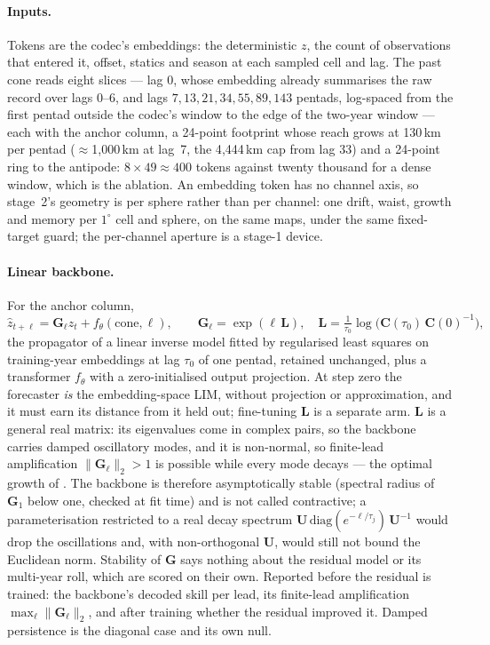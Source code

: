 \documentclass[10pt]{article}
\begin{document}
\paragraph{Inputs.} Tokens are the codec's embeddings: the deterministic
$z$, the count of observations that entered it, offset, statics and season
at each sampled cell and lag. The past cone reads eight slices --- lag 0,
whose embedding already summarises the raw record over lags 0--6, and lags
$7,13,21,34,55,89,143$ pentads, log-spaced from the first pentad outside the
codec's window to the edge of the two-year window --- each with the anchor
column, a 24-point footprint whose reach grows at 130\,km per pentad
(${\approx}$1{,}000\,km at lag~7, the 4{,}444\,km cap from lag 33) and a
24-point ring to the antipode: $8\times49\approx400$ tokens against twenty
thousand for a dense window, which is the ablation. An embedding token has
no channel axis, so stage~2's geometry is per sphere rather than per channel:
one drift, waist, growth and memory per $1^\circ$ cell and sphere, on the
same maps, under the same fixed-target guard; the per-channel aperture is a
stage-1 device.

\paragraph{Linear backbone.} For the anchor column,
\begin{equation}
\hat z_{t+\ell}=\mathbf{G}_\ell z_t+f_\theta(\text{cone},\ell),\qquad
\mathbf{G}_\ell=\exp(\ell\,\mathbf{L}),\quad
\mathbf{L}=\tfrac{1}{\tau_0}\log\!\big(\mathbf{C}(\tau_0)\,\mathbf{C}(0)^{-1}\big) ,
\end{equation}
the propagator of a linear inverse model \cite{penland,newman} fitted by
regularised least squares on training-year embeddings at lag
$\tau_0$ of one pentad, retained unchanged, plus a transformer $f_\theta$
with a zero-initialised output projection. At step zero the forecaster
\emph{is} the embedding-space LIM, without projection or approximation, and
it must earn its distance from it held out; fine-tuning $\mathbf{L}$ is a
separate arm. $\mathbf{L}$ is a general real matrix: its eigenvalues come in
complex pairs, so the backbone carries damped oscillatory modes, and it is
non-normal, so finite-lead amplification $\|\mathbf{G}_\ell\|_2>1$ is
possible while every mode decays --- the optimal growth of \cite{penland}.
The backbone is therefore asymptotically stable (spectral radius of
$\mathbf{G}_1$ below one, checked at fit time) and is not called contractive;
a parameterisation restricted to a real decay spectrum
$\mathbf{U}\,\mathrm{diag}(e^{-\ell/\tau_j})\,\mathbf{U}^{-1}$ would drop the
oscillations and, with non-orthogonal $\mathbf{U}$, would still not bound the
Euclidean norm. Stability of $\mathbf{G}$ says nothing about the residual
model or its multi-year roll, which are scored on their own. Reported before
the residual is trained: the backbone's decoded skill per lead, its
finite-lead amplification $\max_\ell\|\mathbf{G}_\ell\|_2$, and after
training whether the residual improved it. Damped persistence is the diagonal
case and its own null.
\end{document}
